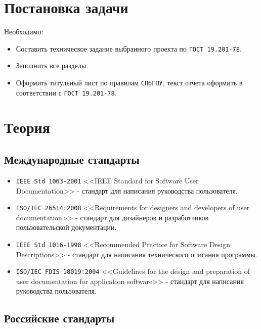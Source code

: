 \documentclass[a4paper, 14pt]{article}
\begin{document}
\Large
\tableofcontents
\large

\newpage
\section{Постановка задачи}

Необходимо:

\begin{itemize}
    \item Составить техническое задание выбранного проекта по \texttt{ГОСТ 19.201-78}.
    \item Заполнить все разделы.
    \item Оформить титульный лист по правилам \texttt{СПбГПУ}, текст отчета оформить в соответствии с \texttt{ГОСТ 19.201-78}.
\end{itemize}

\newpage
\section{Теория}

\subsection{Международные стандарты}

\begin{itemize}
    \item \texttt{IEEE Std 1063-2001} <<IEEE Standard for Software User Documentation>> - стандарт для написания руководства пользователя.
    \item \texttt{ISO/IEC 26514:2008} <<Requirements for designers and developers of user documentation>> - стандарт для дизайнеров и разработчиков пользовательской документации.
    \item \texttt{IEEE Std 1016-1998} <<Recommended Practice for Software Design Descriptions>> - стандарт для написания технического описания программы.
    \item \texttt{ISO/IEC FDIS 18019:2004} <<Guidelines for the design and preparation of user documentation for application software>> - стандарт для написания руководства пользователя.
\end{itemize}

\subsection{Российские стандарты}
\end{document}
